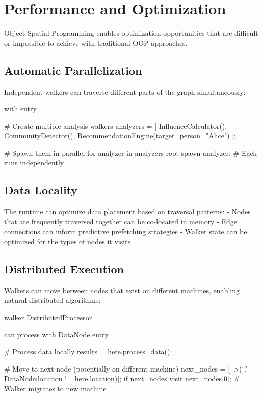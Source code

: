 \section{Performance and Optimization}

Object-Spatial Programming enables optimization opportunities that are difficult or impossible to achieve with traditional OOP approaches.

\subsection{Automatic Parallelization}

Independent walkers can traverse different parts of the graph simultaneously:

\begin{jacblock}
with entry {
    # Create multiple analysis walkers
    analyzers = [
        InfluenceCalculator(),
        CommunityDetector(),
        RecommendationEngine(target_person="Alice")
    ];

    # Spawn them in parallel
    for analyzer in analyzers {
        root spawn analyzer;  # Each runs independently
    }
}
\end{jacblock}

\subsection{Data Locality}

The runtime can optimize data placement based on traversal patterns:
- Nodes that are frequently traversed together can be co-located in memory
- Edge connections can inform predictive prefetching strategies
- Walker state can be optimized for the types of nodes it visits

\subsection{Distributed Execution}

Walkers can move between nodes that exist on different machines, enabling natural distributed algorithms:

\begin{jacblock}
walker DistributedProcessor {
    can process with DataNode entry {
        # Process data locally
        results = here.process_data();

        # Move to next node (potentially on different machine)
        next_nodes = [-->(`?DataNode:location != here.location)];
        if next_nodes {
            visit next_nodes[0];  # Walker migrates to new machine
        }
    }
}
\end{jacblock}

